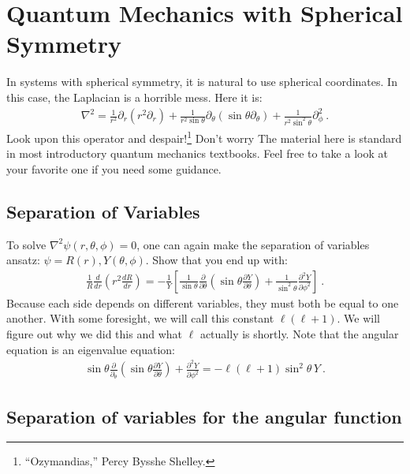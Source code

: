 \documentclass[12pt]{article}
\numberwithin{equation}{section}    %
\begin{document}
\section{Quantum Mechanics with Spherical Symmetry}

In systems with spherical symmetry, it is natural to use spherical coordinates. In this case, the Laplacian is a horrible mess. Here it is:
\begin{align}
	\nabla^2
	=
	\frac{1}{r^2}
	\partial_r \left(r^2\partial_r\right)
	+\frac{1}{r^2\sin\theta}\partial_\theta \left(\sin\theta\partial_\theta\right)
	+\frac{1}{r^2\sin^2\theta} \partial_\phi^2 \ .
\end{align}
Look upon this operator and despair!\footnote{``Ozymandias,'' Percy Bysshe Shelley.} Don't worry The material here is standard in most introductory quantum mechanics textbooks. Feel free to take a look at your favorite one if you need some guidance.

\subsection{Separation of Variables}

To solve $\nabla^2 \psi(r,\theta,\phi)=0$, one can again make the separation of variables ansatz: $\psi= R(r), Y(\theta, \phi)$. Show that you end up with:
\begin{align}
	\frac{1}{R}\frac{d}{dr}\left(r^2\frac{dR}{dr}\right)
	= 
	-\frac{1}{Y}
	\left[
	\frac{1}{\sin\theta}\frac{\partial}{\partial \theta}
	\left(\sin\theta \frac{\partial Y}{\partial \theta}\right)
	+ \frac{1}{\sin^2\theta}\frac{\partial^2Y}{\partial\phi^2} 
	\right] \ .
\end{align}
Because each side depends on different variables, they must both be equal to one another. With some foresight, we will call this constant $\ell(\ell+1)$. We will figure out why we did this and what $\ell$ actually is shortly. Note that the angular equation is an eigenvalue equation:
\begin{align}
	\sin\theta \frac{\partial}{\partial_\theta}\left(\sin\theta \frac{\partial Y}{\partial\theta}\right) + \frac{\partial^2 Y}{\partial\phi^2}
	= -\ell(\ell+1)\sin^2\theta \, Y \ .
	\label{eq:Y:l}
\end{align}


\subsection{Separation of variables for the angular function}
\end{document}
